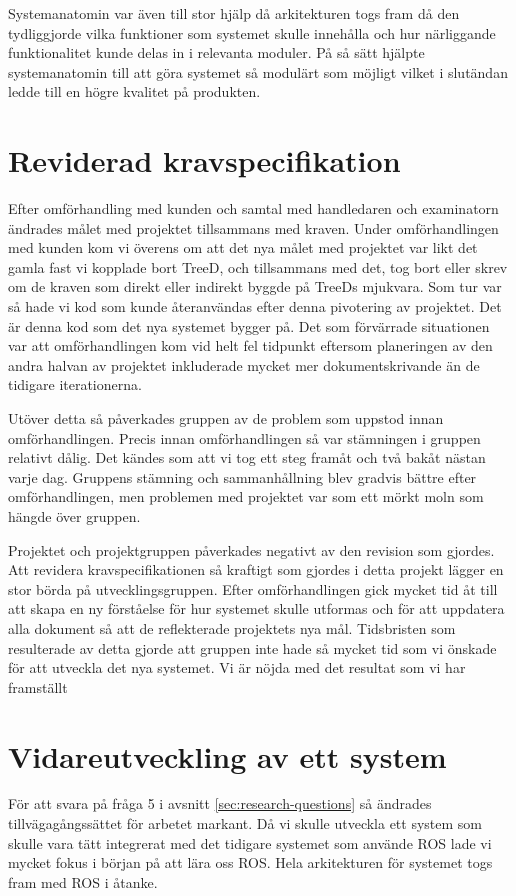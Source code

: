 Systemanatomin var även till stor hjälp då arkitekturen togs fram då den tydliggjorde vilka funktioner som systemet skulle innehålla och hur närliggande funktionalitet kunde delas in i relevanta moduler. På så sätt hjälpte systemanatomin till att göra systemet så modulärt som möjligt vilket i slutändan ledde till en högre kvalitet på produkten.

\section{Reviderad kravspecifikation}
Efter omförhandling med kunden och samtal med handledaren och examinatorn ändrades målet med projektet tillsammans med kraven. Under omförhandlingen med kunden kom vi överens om att det nya målet med projektet var likt det gamla fast vi kopplade bort TreeD, och tillsammans med det, tog bort eller skrev om de kraven som direkt eller indirekt byggde på TreeDs mjukvara. Som tur var så hade vi kod som kunde återanvändas efter denna pivotering av projektet. Det är denna kod som det nya systemet bygger på. Det som förvärrade situationen var att omförhandlingen kom vid helt fel tidpunkt eftersom planeringen av den andra halvan av projektet inkluderade mycket mer dokumentskrivande än de tidigare iterationerna.

Utöver detta så påverkades gruppen av de problem som uppstod innan omförhandlingen. Precis innan omförhandlingen så var stämningen i gruppen relativt dålig. Det kändes som att vi tog ett steg framåt och två bakåt nästan varje dag. Gruppens stämning och sammanhållning blev gradvis bättre efter omförhandlingen, men problemen med projektet var som ett mörkt moln som hängde över gruppen.

Projektet och projektgruppen påverkades negativt av den revision som gjordes. Att revidera kravspecifikationen så kraftigt som gjordes i detta projekt lägger en stor börda på utvecklingsgruppen. Efter omförhandlingen gick mycket tid åt till att skapa en ny förståelse för hur systemet skulle utformas och för att uppdatera alla dokument så att de reflekterade projektets nya mål. Tidsbristen som resulterade av detta gjorde att gruppen inte hade så mycket tid som vi önskade för att utveckla det nya systemet. Vi är nöjda med det resultat som vi har framställt  

\section{Vidareutveckling av ett system}
För att svara på fråga 5 i avsnitt \ref{sec:research-questions} så ändrades tillvägagångssättet för arbetet markant. Då vi skulle utveckla ett system som skulle vara tätt integrerat med det tidigare systemet som använde ROS lade vi mycket fokus i början på att lära oss ROS. Hela arkitekturen för  systemet togs fram med ROS i åtanke.

